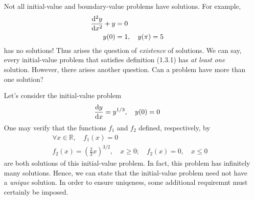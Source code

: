 Not all initial-value and boundary-value problems have solutions. For example,
\begin{align*}
    \dv[2]{y}{x} + y &= 0 \\
    y(0) &= 1, \quad y(\pi) = 5
\end{align*}
has no solutions! Thus arises the question of \textit{existence} of solutions. We can say, every initial-value problem that satisfies definition (1.3.1) has \textit{at least one} solution. However, there arises another question. Can a problem have more than one solution?

Let's consider the initial-value problem
\[ \dv{y}{x} = y^{1/3}, \quad y(0) = 0 \]
One may verify that the functions $f_1$ and $f_2$ defined, respectively, by
\begin{align*}
        &\forall x\in \mathbb{R}, \quad f_1(x) = 0 \\
        &f_2(x) = (\frac{2}{3}x)^{3/2}, \quad x \ge 0; \quad f_2(x) = 0, \quad x \le 0
\end{align*} are both solutions of this initial-value problem. In fact, this problem has infinitely many solutions. Hence, we can state that the initial-value problem need not have a \textit{unique} solution. In order to ensure uniqeness, some additional requiremnt must certainly be imposed.


